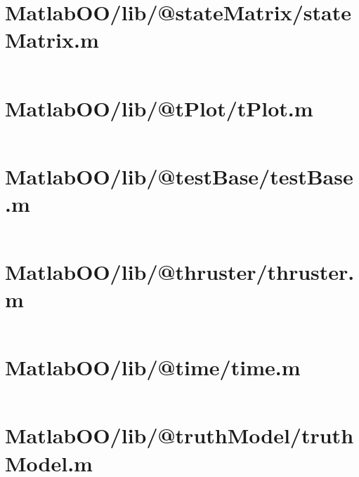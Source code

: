 \pagebreak
\section*{MatlabOO/lib/@stateMatrix/stateMatrix.m}\label{code:MatlabOO/lib/@stateMatrix/stateMatrix.m}
\inputminted[linenos,fontsize=\scriptsize]{matlab}{/home/dcouture/git/mathyourlife/TSatPy/beta_versions/matlab_object_oriented/lib/@stateMatrix/stateMatrix.m}

\pagebreak
\section*{MatlabOO/lib/@tPlot/tPlot.m}\label{code:MatlabOO/lib/@tPlot/tPlot.m}
\inputminted[linenos,fontsize=\scriptsize]{matlab}{/home/dcouture/git/mathyourlife/TSatPy/beta_versions/matlab_object_oriented/lib/@tPlot/tPlot.m}

\pagebreak
\section*{MatlabOO/lib/@testBase/testBase.m}\label{code:MatlabOO/lib/@testBase/testBase.m}
\inputminted[linenos,fontsize=\scriptsize]{matlab}{/home/dcouture/git/mathyourlife/TSatPy/beta_versions/matlab_object_oriented/lib/@testBase/testBase.m}

\pagebreak
\section*{MatlabOO/lib/@thruster/thruster.m}\label{code:MatlabOO/lib/@thruster/thruster.m}
\inputminted[linenos,fontsize=\scriptsize]{matlab}{/home/dcouture/git/mathyourlife/TSatPy/beta_versions/matlab_object_oriented/lib/@thruster/thruster.m}

\pagebreak
\section*{MatlabOO/lib/@time/time.m}\label{code:MatlabOO/lib/@time/time.m}
\inputminted[linenos,fontsize=\scriptsize]{matlab}{/home/dcouture/git/mathyourlife/TSatPy/beta_versions/matlab_object_oriented/lib/@time/time.m}

\pagebreak
\section*{MatlabOO/lib/@truthModel/truthModel.m}\label{code:MatlabOO/lib/@truthModel/truthModel.m}
\inputminted[linenos,fontsize=\scriptsize]{matlab}{/home/dcouture/git/mathyourlife/TSatPy/beta_versions/matlab_object_oriented/lib/@truthModel/truthModel.m}

